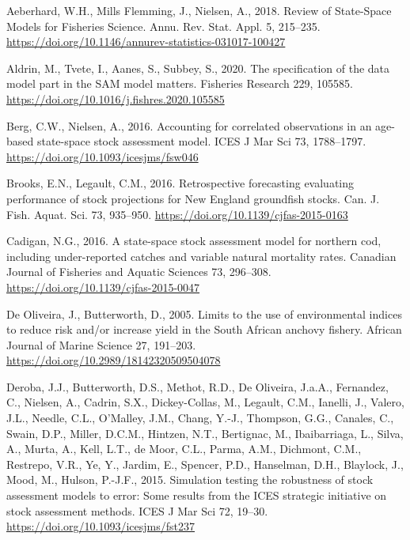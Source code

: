 \documentclass[]{article}
\begin{document}
\hypertarget{refs}{}
\leavevmode\hypertarget{ref-aeberhard2018Review}{}%
Aeberhard, W.H., Mills Flemming, J., Nielsen, A., 2018. Review of
State-Space Models for Fisheries Science. Annu. Rev. Stat. Appl. 5,
215--235. \url{https://doi.org/10.1146/annurev-statistics-031017-100427}

\leavevmode\hypertarget{ref-aldrin2020Specification}{}%
Aldrin, M., Tvete, I., Aanes, S., Subbey, S., 2020. The specification of
the data model part in the SAM model matters. Fisheries Research 229,
105585. \url{https://doi.org/10.1016/j.fishres.2020.105585}

\leavevmode\hypertarget{ref-berg2016Accounting}{}%
Berg, C.W., Nielsen, A., 2016. Accounting for correlated observations in
an age-based state-space stock assessment model. ICES J Mar Sci 73,
1788--1797. \url{https://doi.org/10.1093/icesjms/fsw046}

\leavevmode\hypertarget{ref-brooks2016Retrospective}{}%
Brooks, E.N., Legault, C.M., 2016. Retrospective forecasting evaluating
performance of stock projections for New England groundfish stocks. Can.
J. Fish. Aquat. Sci. 73, 935--950.
\url{https://doi.org/10.1139/cjfas-2015-0163}

\leavevmode\hypertarget{ref-cadigan2016Statespace}{}%
Cadigan, N.G., 2016. A state-space stock assessment model for northern
cod, including under-reported catches and variable natural mortality
rates. Canadian Journal of Fisheries and Aquatic Sciences 73, 296--308.
\url{https://doi.org/10.1139/cjfas-2015-0047}

\leavevmode\hypertarget{ref-deoliveira2005Limits}{}%
De Oliveira, J., Butterworth, D., 2005. Limits to the use of
environmental indices to reduce risk and/or increase yield in the South
African anchovy fishery. African Journal of Marine Science 27, 191--203.
\url{https://doi.org/10.2989/18142320509504078}

\leavevmode\hypertarget{ref-deroba2015Simulation}{}%
Deroba, J.J., Butterworth, D.S., Methot, R.D., De Oliveira, J.a.A.,
Fernandez, C., Nielsen, A., Cadrin, S.X., Dickey-Collas, M., Legault,
C.M., Ianelli, J., Valero, J.L., Needle, C.L., O'Malley, J.M., Chang,
Y.-J., Thompson, G.G., Canales, C., Swain, D.P., Miller, D.C.M.,
Hintzen, N.T., Bertignac, M., Ibaibarriaga, L., Silva, A., Murta, A.,
Kell, L.T., de Moor, C.L., Parma, A.M., Dichmont, C.M., Restrepo, V.R.,
Ye, Y., Jardim, E., Spencer, P.D., Hanselman, D.H., Blaylock, J., Mood,
M., Hulson, P.-J.F., 2015. Simulation testing the robustness of stock
assessment models to error: Some results from the ICES strategic
initiative on stock assessment methods. ICES J Mar Sci 72, 19--30.
\url{https://doi.org/10.1093/icesjms/fst237}
\end{document}
